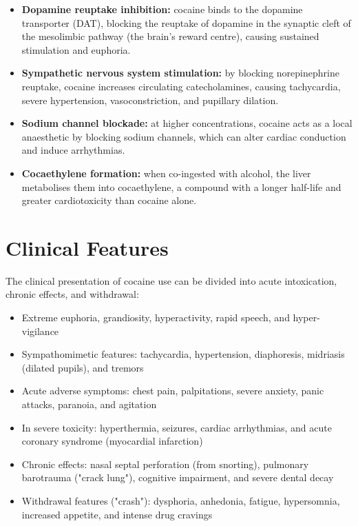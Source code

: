 \begin{itemize}
    \item \textbf{Dopamine reuptake inhibition:} cocaine binds to the dopamine transporter (DAT), blocking the reuptake of dopamine in the synaptic cleft of the mesolimbic pathway (the brain's reward centre), causing sustained stimulation and euphoria.
    \item \textbf{Sympathetic nervous system stimulation:} by blocking norepinephrine reuptake, cocaine increases circulating catecholamines, causing tachycardia, severe hypertension, vasoconstriction, and pupillary dilation.
    \item \textbf{Sodium channel blockade:} at higher concentrations, cocaine acts as a local anaesthetic by blocking sodium channels, which can alter cardiac conduction and induce arrhythmias.
    \item \textbf{Cocaethylene formation:} when co-ingested with alcohol, the liver metabolises them into cocaethylene, a compound with a longer half-life and greater cardiotoxicity than cocaine alone.
\end{itemize}

\section*{Clinical Features}
The clinical presentation of cocaine use can be divided into acute intoxication, chronic effects, and withdrawal:

\begin{itemize}
    \item Extreme euphoria, grandiosity, hyperactivity, rapid speech, and hyper-vigilance
    \item Sympathomimetic features: tachycardia, hypertension, diaphoresis, midriasis (dilated pupils), and tremors
    \item Acute adverse symptoms: chest pain, palpitations, severe anxiety, panic attacks, paranoia, and agitation
    \item In severe toxicity: hyperthermia, seizures, cardiac arrhythmias, and acute coronary syndrome (myocardial infarction)
    \item Chronic effects: nasal septal perforation (from snorting), pulmonary barotrauma ("crack lung"), cognitive impairment, and severe dental decay
    \item Withdrawal features ("crash"): dysphoria, anhedonia, fatigue, hypersomnia, increased appetite, and intense drug cravings
\end{itemize}


